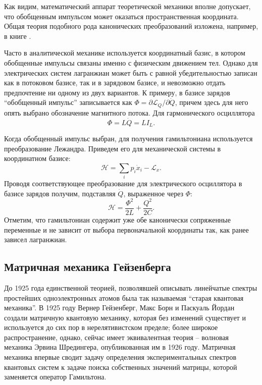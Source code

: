 \documentclass[14pt, a4paper]{extreport}
\numberwithin{equation}{section}
\begin{document}
Как видим, математический аппарат теоретической механики вполне допускает, что обобщенным импульсом может оказаться пространственная координата. Общая теория подобного рода канонических преобразований изложена, например, в книге \cite{shmutzer1976}.

Часто в аналитической механике используется координатный базис, в котором обобщенные импульсы связаны именно с физическим движением тел. Однако для электрических систем лагранжиан может быть с равной убедительностью записан как в потоковом базисе, так и в зарядовом базисе, и невозможно отдать предпочтение ни одному из двух вариантов. К примеру, в базисе зарядов ``обобщенный импульс'' записывается как $\Phi = \partial \mathcal{L}_Q / \partial \dot Q$, причем здесь для него опять выбрано обозначение магнитного потока. Для гармонического осциллятора
\begin{equation}
	\Phi = L\dot Q = LI_L. \label{eq:Phi}
\end{equation}

Когда обобщенный импульс выбран, для получения гамильтониана используется преобразование Лежандра. Приведем его для механической системы в координатном базисе:
\begin{equation}
	\mathcal{H} = \sum_i p_i \dot x_i - \mathcal{L}_x.
\end{equation}
Проводя соответствующее преобразование для электрического осциллятора в базисе зарядов получим, подставляя $\dot Q$, выраженное через $\Phi$:
\begin{equation}
	\mathcal{H} = \frac{\Phi^2}{2 L} + \frac{Q^2}{2C}.\label{eq:planck_electric_osc}
\end{equation}
Отметим, что гамильтониан содержит уже обе канонически сопряженные переменные и не зависит от выбора первоначальной координаты так, как ранее зависел лагранжиан.

\subsection{Матричная механика Гейзенберга}

До 1925 года единственной теорией, позволявшей описывать линейчатые спектры простейших одноэлектронных атомов была так называемая ``старая квантовая механика''. В 1925 году Вернер Гейзенберг, Макс Борн и Паскуаль Йордан создали матричную квантовую механику, которая без изменений существует и используется до сих пор в нерелятивистском пределе; более широкое распространение, однако, сейчас имеет эквивалентная теория -- волновая механика Эрвина Шредингера, опубликованная им в 1926 году. Матричная механика впервые сводит задачу определения экспериментальных спектров квантовых систем к задаче поиска собственных значений матрицы, которой заменяется оператор Гамильтона. 
\end{document}
